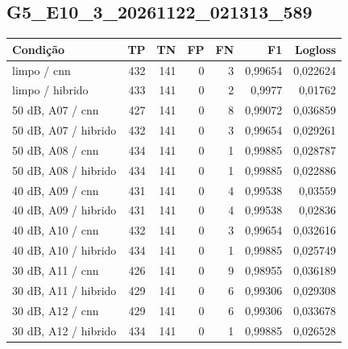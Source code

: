 \subsection{G5\_E10\_3\_20261122\_021313\_589}
\small\begin{longtable}{@{}p{.38\linewidth}rrrrrr@{}}
\toprule Condição & TP & TN & FP & FN & F1 & Logloss\\\midrule\endhead
limpo /\allowbreak{} cnn & 432 & 141 & 0 & 3 & 0,99654 & 0,022624\\
limpo /\allowbreak{} hibrido & 433 & 141 & 0 & 2 & 0,9977 & 0,01762\\
50 dB, A07 /\allowbreak{} cnn & 427 & 141 & 0 & 8 & 0,99072 & 0,036859\\
50 dB, A07 /\allowbreak{} hibrido & 432 & 141 & 0 & 3 & 0,99654 & 0,029261\\
50 dB, A08 /\allowbreak{} cnn & 434 & 141 & 0 & 1 & 0,99885 & 0,028787\\
50 dB, A08 /\allowbreak{} hibrido & 434 & 141 & 0 & 1 & 0,99885 & 0,022886\\
40 dB, A09 /\allowbreak{} cnn & 431 & 141 & 0 & 4 & 0,99538 & 0,03559\\
40 dB, A09 /\allowbreak{} hibrido & 431 & 141 & 0 & 4 & 0,99538 & 0,02836\\
40 dB, A10 /\allowbreak{} cnn & 432 & 141 & 0 & 3 & 0,99654 & 0,032616\\
40 dB, A10 /\allowbreak{} hibrido & 434 & 141 & 0 & 1 & 0,99885 & 0,025749\\
30 dB, A11 /\allowbreak{} cnn & 426 & 141 & 0 & 9 & 0,98955 & 0,036189\\
30 dB, A11 /\allowbreak{} hibrido & 429 & 141 & 0 & 6 & 0,99306 & 0,029308\\
30 dB, A12 /\allowbreak{} cnn & 429 & 141 & 0 & 6 & 0,99306 & 0,033678\\
30 dB, A12 /\allowbreak{} hibrido & 434 & 141 & 0 & 1 & 0,99885 & 0,026528\\
\bottomrule\end{longtable}\normalsize

